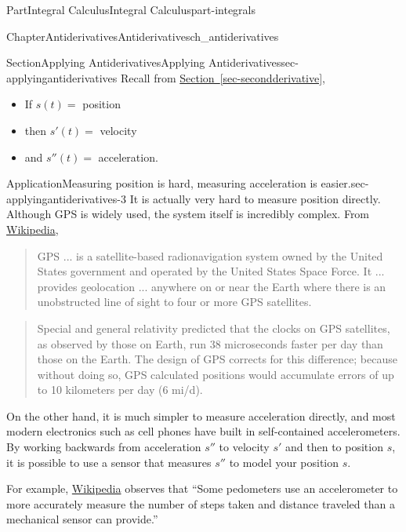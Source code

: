 \documentclass[oneside,10pt,]{tufte-book}
\newcommand{\xreffont}{\relax}
\numberwithin{equation}{chapter}
\begin{document}
\begin{partptx}{Part}{Integral Calculus}{}{Integral Calculus}{}{}{part-integrals}
\begin{chapterptx}{Chapter}{Antiderivatives}{}{Antiderivatives}{}{}{ch_antiderivatives}
%
\begin{sectionptx}{Section}{Applying Antiderivatives}{}{Applying Antiderivatives}{}{}{sec-applyingantiderivatives}
Recall from \hyperref[sec-secondderivative]{Section~{\xreffont\ref{sec-secondderivative}}},%
\begin{itemize}[label=\textbullet]
\item{}If \(s(t) = \) position%
\item{}then \(s'(t) = \) velocity%
\item{}and \(s''(t) = \) acceleration.%
\end{itemize}
%
\begin{insight}{Application}{Measuring position is hard, measuring acceleration is easier.}{sec-applyingantiderivatives-3}%
It is actually very hard to measure position directly.  Although GPS is widely used, the system itself is incredibly complex.  From \href{https://en.wikipedia.org/wiki/Global_Positioning_System}{Wikipedia}\footnotemark{},%
\begin{quote}%
GPS ... is a satellite-based radionavigation system owned by the United States government and operated by the United States Space Force. It ... provides geolocation ... anywhere on or near the Earth where there is an unobstructed line of sight to four or more GPS satellites.%
\end{quote}
\begin{quote}%
Special and general relativity predicted that the clocks on GPS satellites, as observed by those on Earth, run 38 microseconds faster per day than those on the Earth. The design of GPS corrects for this difference; because without doing so, GPS calculated positions would accumulate errors of up to 10 kilometers per day (6 mi\slash{}d).%
\end{quote}
On the other hand, it is much simpler to measure acceleration directly, and most modern electronics such as cell phones have built in self-contained accelerometers. By working backwards from acceleration \(s''\) to velocity \(s'\) and then to position \(s\), it is possible to use a sensor that measures \(s''\) to model your position \(s\).%
\par
For example, \href{https://en.wikipedia.org/wiki/Accelerometer\#Consumer_electronics}{Wikipedia}\footnotemark{} observes that ``Some pedometers use an accelerometer to more accurately measure the number of steps taken and distance traveled than a mechanical sensor can provide.''%
\end{insight}
%

\end{sectionptx}
\end{chapterptx}
\end{partptx}
\end{document}
